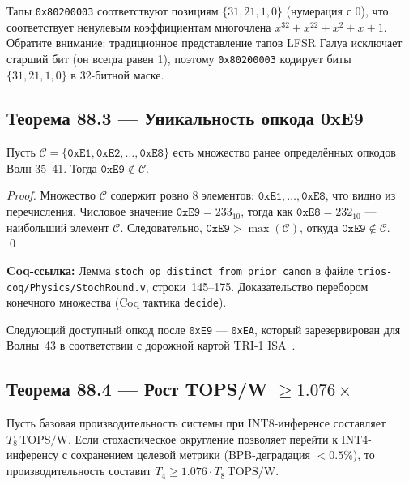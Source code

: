 \begin{remark}
Тапы \texttt{0x80200003} соответствуют позициям $\{31, 21, 1, 0\}$
(нумерация с 0), что соответствует ненулевым коэффициентам
многочлена $x^{32} + x^{22} + x^2 + x + 1$.
Обратите внимание: традиционное представление тапов LFSR Галуа
исключает старший бит (он всегда равен 1), поэтому
\texttt{0x80200003} кодирует биты $\{31, 21, 1, 0\}$
в 32-битной маске.
\end{remark}

\subsection{Теорема 88.3 — Уникальность опкода 0xE9}
\label{ssec:glava88-thm3}

\begin{theorem}
\label{thm:opcode-unique}
Пусть $\mathcal{C} = \{\texttt{0xE1},\texttt{0xE2},\ldots,\texttt{0xE8}\}$
есть множество ранее определённых опкодов Волн 35--41.
Тогда $\texttt{0xE9} \notin \mathcal{C}$.
\end{theorem}

\begin{proof}
Множество $\mathcal{C}$ содержит ровно 8 элементов:
$\texttt{0xE1},\ldots,\texttt{0xE8}$, что видно из перечисления.
Числовое значение $\texttt{0xE9} = 233_{10}$, тогда как
$\texttt{0xE8} = 232_{10}$ — наибольший элемент $\mathcal{C}$.
Следовательно, $\texttt{0xE9} > \max(\mathcal{C})$,
откуда $\texttt{0xE9} \notin \mathcal{C}$. \qed
\end{proof}

\noindent\textbf{Coq-ссылка:}
Лемма \texttt{stoch\_op\_distinct\_from\_prior\_canon} в файле
\texttt{trios-coq/Physics/StochRound.v}, строки~145--175.
Доказательство перебором конечного множества (Coq тактика
\texttt{decide}).

\begin{remark}
Следующий доступный опкод после \texttt{0xE9} — \texttt{0xEA},
который зарезервирован для Волны~43 в соответствии
с дорожной картой TRI-1 ISA~\cite{trios898}.
\end{remark}

\subsection{Теорема 88.4 — Рост TOPS/W $\geq 1{.}076\times$}
\label{ssec:glava88-thm4}

\begin{theorem}
\label{thm:tops-lift}
Пусть базовая производительность системы при INT8-инференсе
составляет $T_8\,\text{TOPS/W}$.  Если стохастическое округление
позволяет перейти к INT4-инференсу с сохранением целевой метрики
(BPB-деградация $< 0{.}5\%$), то производительность составит
$T_4 \geq 1{.}076 \cdot T_8\,\text{TOPS/W}$.
\end{theorem}

